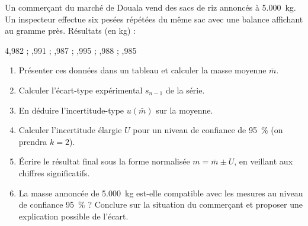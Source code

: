 \documentclass[11pt]{article}
\begin{document}
\begin{exercice}
Un commerçant du marché de Douala vend des sacs de riz annoncés à \SI{5,000}{kg}. Un inspecteur effectue six pesées répétées du même sac avec une balance affichant au gramme près. Résultats (en kg) :
\begin{center}
4,982 \quad ; ,991 \quad ; ,987 \quad ; ,995 \quad ; ,988 \quad ; ,985
\end{center}
\begin{enumerate}
\item Présenter ces données dans un tableau et calculer la masse moyenne $\bar{m}$.
\item Calculer l'écart-type expérimental $s_{n-1}$ de la série.
\item En déduire l'incertitude-type $u(\bar{m})$ sur la moyenne.
\item Calculer l'incertitude élargie $U$ pour un niveau de confiance de \SI{95}{\%} (on prendra $k = 2$).
\item Écrire le résultat final sous la forme normalisée $m = \bar{m} \pm U$, en veillant aux chiffres significatifs.
\item La masse annoncée de \SI{5,000}{kg} est-elle compatible avec les mesures au niveau de confiance \SI{95}{\%} ? Conclure sur la situation du commerçant et proposer une explication possible de l'écart.
\end{enumerate}
\end{exercice}
\end{document}
